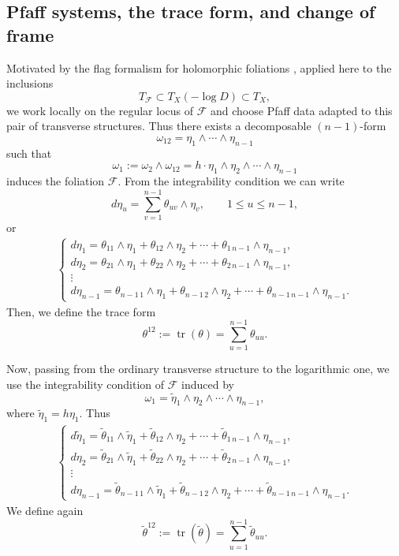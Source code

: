 \documentclass[12pt,reqno,a4paper]{amsart}
\numberwithin{equation}{section}
\theoremstyle{plain}
\theoremstyle{definition}
\newcommand{\cF}{\mathcal{F}}
\begin{document}
 


\subsection{Pfaff systems, the trace form, and change of frame}

Motivated by the flag formalism for holomorphic foliations \cite{BCL}, applied here to the
  inclusions
\[
T_{\cF}\subset T_X(-\log D)\subset T_X,
\]
we work locally on the regular locus of \(\cF\) and choose Pfaff data adapted to
this pair of transverse structures. Thus there exists a decomposable
\((n-1)\)-form
\[
\omega_{12}=\eta_1\wedge\cdots\wedge\eta_{n-1}
\]
such that
\[
\omega_1:=\omega_2\wedge\omega_{12}
=
h\cdot \eta_1\wedge\eta_2\wedge\cdots\wedge\eta_{n-1}
\]
induces the foliation \(\cF\).
From the integrability condition we can write
\[
d\eta_u=\sum_{v=1}^{n-1}\theta_{uv}\wedge\eta_v,
\qquad 1\leq u\leq n-1,
\]
or
\[
\begin{array}{cccc}
\left\{
\begin{array}{llccc}
d\eta_1
=
\theta_{11}\wedge\eta_1
+
\theta_{12}\wedge\eta_2
+\cdots+
\theta_{1\,n-1}\wedge\eta_{n-1}, \\[4pt]
d\eta_2
=
\theta_{21}\wedge\eta_1
+
\theta_{22}\wedge\eta_2
+\cdots+
\theta_{2\,n-1}\wedge\eta_{n-1}, \\
\vdots \\
d\eta_{n-1}
=
\theta_{n-1\,1}\wedge\eta_1
+
\theta_{n-1\,2}\wedge\eta_2
+\cdots+
\theta_{n-1\,n-1}\wedge\eta_{n-1}.
\end{array}
\right.
\end{array}
\]
Then, we define the trace form
\begin{equation}\label{eq:theta12}
\theta^{12}:=\operatorname{tr}(\theta)
=
\sum_{u=1}^{n-1}\theta_{uu}.
\end{equation}

Now, passing from the ordinary transverse structure to the logarithmic one, we
use the integrability condition of \(\cF\) induced by
\[
\omega_1
=
\widetilde{\eta}_1\wedge\eta_2\wedge\cdots\wedge\eta_{n-1},
\]
where \(\widetilde{\eta}_1=h\eta_1\). Thus
\[
\begin{array}{cccc}
\left\{
\begin{array}{llccc}
d\widetilde{\eta}_1
=
\widetilde{\theta}_{11}\wedge\widetilde{\eta}_1
+
\widetilde{\theta}_{12}\wedge\eta_2
+\cdots+
\widetilde{\theta}_{1\,n-1}\wedge\eta_{n-1}, \\[4pt]
d\eta_2
=
\widetilde{\theta}_{21}\wedge\widetilde{\eta}_1
+
\widetilde{\theta}_{22}\wedge\eta_2
+\cdots+
\widetilde{\theta}_{2\,n-1}\wedge\eta_{n-1}, \\
\vdots \\
d\eta_{n-1}
=
\widetilde{\theta}_{n-1\,1}\wedge\widetilde{\eta}_1
+
\widetilde{\theta}_{n-1\,2}\wedge\eta_2
+\cdots+
\widetilde{\theta}_{n-1\,n-1}\wedge\eta_{n-1}.
\end{array}
\right.
\end{array}
\]
We define again
\begin{equation}\label{eq:theta12til}
\widetilde{\theta}^{12}
:=
\operatorname{tr}(\widetilde\theta)
=
\sum_{u=1}^{n-1}\widetilde\theta_{uu}.
\end{equation}
\end{document}
